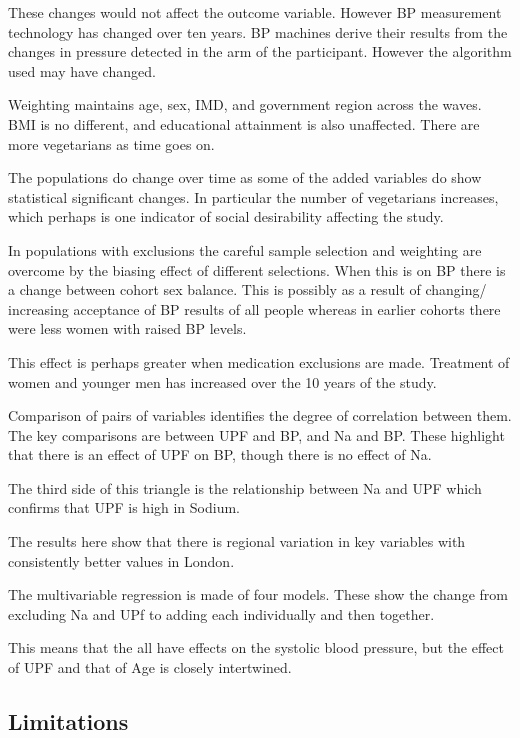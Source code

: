 \documentclass[
]{article}
\begin{document}
These changes would not affect the outcome variable. However BP
measurement technology has changed over ten years. BP machines derive
their results from the changes in pressure detected in the arm of the
participant. However the algorithm used may have changed.

Weighting maintains age, sex, IMD, and government region across the
waves. BMI is no different, and educational attainment is also
unaffected. There are more vegetarians as time goes on.

The populations do change over time as some of the added variables do
show statistical significant changes. In particular the number of
vegetarians increases, which perhaps is one indicator of social
desirability affecting the study.

In populations with exclusions the careful sample selection and
weighting are overcome by the biasing effect of different selections.
When this is on BP there is a change between cohort sex balance. This is
possibly as a result of changing/ increasing acceptance of BP results of
all people whereas in earlier cohorts there were less women with raised
BP levels.

This effect is perhaps greater when medication exclusions are made.
Treatment of women and younger men has increased over the 10 years of
the study.

Comparison of pairs of variables identifies the degree of correlation
between them. The key comparisons are between UPF and BP, and Na and BP.
These highlight that there is an effect of UPF on BP, though there is no
effect of Na.

The third side of this triangle is the relationship between Na and UPF
which confirms that UPF is high in Sodium.

The results here show that there is regional variation in key variables
with consistently better values in London.

The multivariable regression is made of four models. These show the
change from excluding Na and UPf to adding each individually and then
together.

This means that the all have effects on the systolic blood pressure, but
the effect of UPF and that of Age is closely intertwined.

\hypertarget{limitations}{%
\subsection{Limitations}\label{limitations}}
\end{document}

